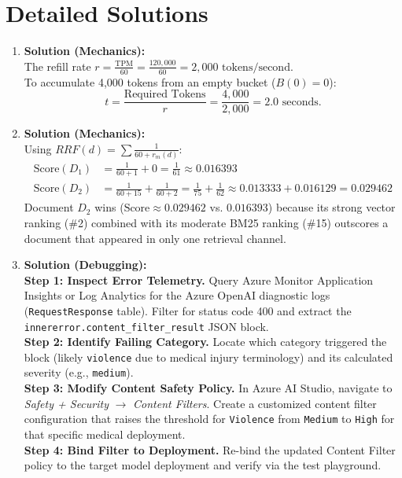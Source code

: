 \section{Detailed Solutions}
\begin{enumerate}[leftmargin=18pt]
  \item \textbf{Solution (Mechanics):}\\
  The refill rate $r = \frac{\text{TPM}}{60} = \frac{120,000}{60} = 2,000 \text{ tokens/second}$.\\
  To accumulate 4,000 tokens from an empty bucket ($B(0) = 0$):
  \begin{equation*}
  t = \frac{\text{Required Tokens}}{r} = \frac{4,000}{2,000} = 2.0 \text{ seconds}.
  \end{equation*}

  \item \textbf{Solution (Mechanics):}\\
  Using $RRF(d) = \sum \frac{1}{60 + r_m(d)}$:
  \begin{align*}
  \text{Score}(D_1) &= \frac{1}{60 + 1} + 0 = \frac{1}{61} \approx 0.016393 \\
  \text{Score}(D_2) &= \frac{1}{60 + 15} + \frac{1}{60 + 2} = \frac{1}{75} + \frac{1}{62} \approx 0.013333 + 0.016129 = 0.029462
  \end{align*}
  Document $D_2$ wins ($\text{Score} \approx 0.029462$ vs. $0.016393$) because its strong vector ranking (\#2) combined with its moderate BM25 ranking (\#15) outscores a document that appeared in only one retrieval channel.

  \item \textbf{Solution (Debugging):}\\
  \textbf{Step 1: Inspect Error Telemetry.} Query Azure Monitor Application Insights or Log Analytics for the Azure OpenAI diagnostic logs (\texttt{RequestResponse} table). Filter for status code 400 and extract the \texttt{innererror.content\_filter\_result} JSON block.\\
  \textbf{Step 2: Identify Failing Category.} Locate which category triggered the block (likely \texttt{violence} due to medical injury terminology) and its calculated severity (e.g., \texttt{medium}).\\
  \textbf{Step 3: Modify Content Safety Policy.} In Azure AI Studio, navigate to \emph{Safety + Security} $\to$ \emph{Content Filters}. Create a customized content filter configuration that raises the threshold for \texttt{Violence} from \texttt{Medium} to \texttt{High} for that specific medical deployment.\\
  \textbf{Step 4: Bind Filter to Deployment.} Re-bind the updated Content Filter policy to the target model deployment and verify via the test playground.


\end{enumerate}
